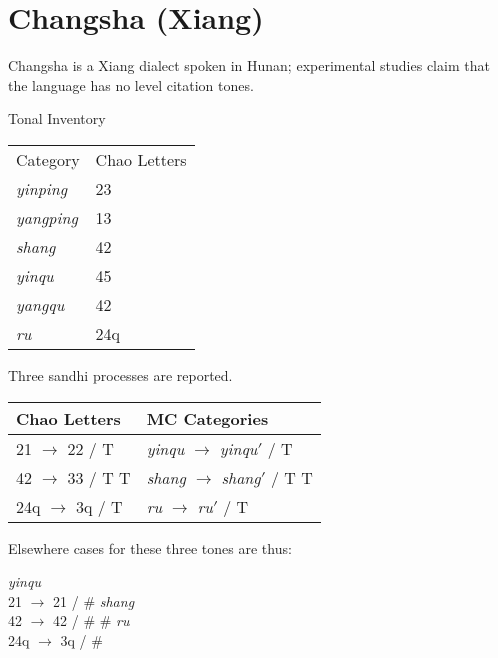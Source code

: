 \documentclass{article}
\begin{document}
\section{Changsha (Xiang)}
Changsha is a Xiang dialect spoken in Hunan; experimental studies claim that the language has no level citation tones. \cite{Liandliu2006} 
\begin{exe}
\ex Tonal Inventory \\
\begin{tabular}[t]{|ll|}
\hline
Category & Chao Letters \\
\textit{yinping} & 23 \\
\textit{yangping} & 13 \\
\textit{shang} & 42 \\
\textit{yinqu} & 45 \\
\textit{yangqu} & 42 \\
\textit{ru} & 24q \\
\hline
\end{tabular}
\end{exe}
Three sandhi processes are reported.
\begin{exe}
\ex
\begin{tabular}[t]{ll}
Chao Letters & MC Categories \\
\hline
21 $\rightarrow$ 22 / \underline{\hspace{1em}} T & \textit{yinqu} $\rightarrow$ \textit{yinqu}$'$ / \underline{\hspace{1em}} T \\ 
42 $\rightarrow$ 33 / T \underline{\hspace{1em}} T & \textit{shang} $\rightarrow$ \textit{shang}$'$ / T  \underline{\hspace{1em}} T \\ 
24q $\rightarrow$ 3q / \underline{\hspace{1em}} T & \textit{ru} $\rightarrow$ \textit{ru}$'$ / \underline{\hspace{1em}} T \\ 
\end{tabular}
\end{exe}
Elsewhere cases for these three tones are thus:
\begin{exe}
\ex 
\begin{xlist}
\ex \textit{yinqu} \\
21 $\rightarrow$ 21 / \underline{\hspace{1em}} \#
\ex \textit{shang} \\
42 $\rightarrow$ 42 / \# \underline{\hspace{1em}} \#
\ex \textit{ru} \\
24q $\rightarrow$ 3q / \underline{\hspace{1em}} \#
\end{xlist}
\end{exe}
\end{document}
